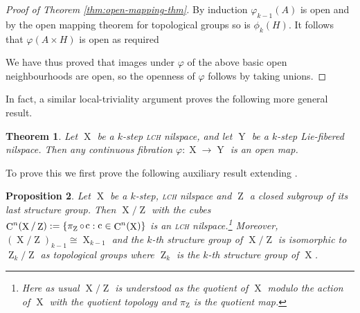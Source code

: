 \documentclass[a4paper,12pt,reqno]{amsart}
\newtheorem{theorem}{Theorem}[section]
\newtheorem{proposition}[theorem]{Proposition}
\theoremstyle{definition}
\def\to{\rightarrow}
\DeclareMathOperator{\ab}{Z}
\DeclareMathOperator{\q}{c}
\DeclareMathOperator{\ns}{X}
\DeclareMathOperator{\nss}{Y}
\DeclareMathOperator{\co}{\circ\hspace{-0.02 cm}}
\DeclareMathOperator{\cu}{C}
\begin{document}
\begin{proof}[Proof of Theorem \ref{thm:open-mapping-thm}]
By induction $\varphi_{k-1}(A)$ is open and by the open mapping theorem for topological groups so is $\phi_k(H)$. It follows that $\varphi(A\times H)$ is open as required

We have thus proved that images under $\varphi$ of the above basic open neighbourhoods are open, so the openness of $\varphi$ follows by taking unions.
\end{proof}
\noindent In fact, a similar local-triviality argument  proves the following more general result.
\begin{theorem}\label{thm:open-mapping-general}
Let $\ns$ be a $k$-step \textsc{lch} nilspace, and let $\nss$ be a $k$-step Lie-fibered nilspace. Then any continuous fibration $\varphi:\ns\to\nss$ is an open map.
\end{theorem}

\noindent To prove this we first prove the following auxiliary result extending \cite[Proposition A.19]{CGSS-p-hom}.
\begin{proposition}\label{prop:quot-last-str-gr}
Let $\ns$ be a $k$-step, \textsc{lch} nilspace and $\ab$ a closed subgroup of its last structure group. Then $\ns/\ab$ with the cubes $\cu^n(\ns/\ab):=\{\pi_{\ab}\co \q: \q\in \cu^n(\ns) \}$ is an \textsc{lch} nilspace.\footnote{Here as usual $\ns/\ab$ is understood as the quotient of $\ns$ modulo the action of $\ns$ with the quotient topology and $\pi_{\ab}$ is the quotient map.} Moreover, $(\ns/\ab)_{k-1}\cong \ns_{k-1}$ and the $k$-th structure group of $\ns/\ab$ is isomorphic to $\ab_k/\ab$ as topological groups where $\ab_k$ is the $k$-th structure group of $\ns$.
\end{proposition}
\end{document}
